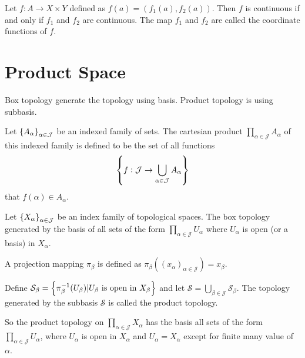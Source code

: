 \begin{theorem}
Let $f: A \rightarrow X \times Y$ defined as $f(a) = \left(f_1(a), f_2(a) \right)$. Then $f$ is continuous if and only if $f_1$ and $f_2$ are continuous. The map $f_1$ and $f_2$ are called the coordinate functions of $f$.
\end{theorem}


\section{Product Space}

Box topology generate the topology using basis. Product topology is using subbasis.
    
\begin{definition}
    Let $\set{A_{\alpha}}_{\alpha \in \mathcal{J}}$ be an indexed family of sets. The cartesian product $\displaystyle \prod_{\alpha \in \mathcal{J}} A_{\alpha}$ of this indexed family is defined to be the set of all functions 
    \begin{equation}
        \set{f : \mathcal{J} \rightarrow \bigcup_{\alpha \in \mathcal{J}} A_{\alpha}}
    \end{equation}
    that $f(\alpha) \in A_{\alpha}$.
\end{definition}

\begin{definition}
    Let $\set{X_{\alpha}}_{\alpha \in \mathcal{J}}$ be an index family of topological spaces. The box topology generated by the basis of all sets of the form $\displaystyle \prod_{\alpha \in \mathcal{J}} U_{\alpha}$ where $U_{\alpha}$ is open (or a basis) in $X_{\alpha}$. 
\end{definition}

\begin{definition}
    A projection mapping $\pi_\beta$ is defined as $\pi_\beta \left( (x_{\alpha})_{\alpha \in \mathcal{J}} \right) = x_\beta$.
\end{definition}

\begin{definition}
    Define $\mathcal{S}_{\beta} = \set{\pi_{\beta}^{-1}(U_{\beta}) | U_{\beta}\text{ is open in }X_{\beta}}$ and let $\mathcal{S} = \displaystyle \bigcup_{\beta \in \mathcal{J}} \mathcal{S}_{\beta}$. The topology generated by the subbasis $\mathcal{S}$ is called the product topology. 
    
    So the product topology on $\displaystyle \prod_{\alpha \in \mathcal{J}} X_{\alpha}$ has the basis all sets of the form $\displaystyle \prod_{\alpha \in \mathcal{J}} U_{\alpha}$, where $U_{\alpha}$ is open in $X_{\alpha}$ and $U_{\alpha} = X_{\alpha}$ except for finite many value of $\alpha$.
\end{definition}

